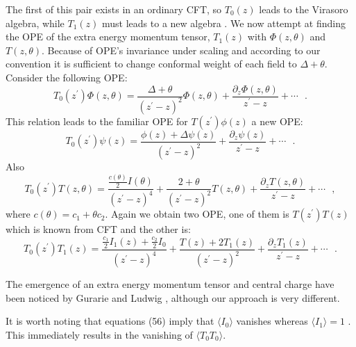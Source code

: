 \documentclass[a4paper,11pt]{article}
\begin{document}
The first of this pair exists in an ordinary CFT, so $T_{0}(z)$
leads to the Virasoro algebra, while $T_{1}(z)$ must leads to a
new algebra \cite{GL}. We now attempt at finding the OPE of the
extra energy momentum tensor, $T_{1}(z)$ with $\Phi(z,\theta)$ and
$T(z,\theta)$. Because of OPE's invariance under scaling and
according to our convention it is sufficient to change conformal
weight of each field to $\Delta+\theta$. Consider the following OPE:
\begin{equation}
T_{0}(z^{\prime})\Phi(z,\theta)=\frac{\Delta+\theta}{(z^{\prime}-z)^{2}}\Phi(z,\theta)+
\frac{\partial_{z}\Phi(z,\theta)}{z^{\prime}-z}+\cdots\:\:\:.
\end{equation}
This relation leads to the familiar OPE for $T(z^{\prime})\phi(z)$
a new OPE:
\begin{equation}
T_{0}(z^{\prime})\psi(z)=\frac{\phi(z)+\Delta\psi(z)}{(z^{\prime}-z)^{2}}+
\frac{\partial_{z}\psi(z)}{z^{\prime}-z}+\cdots\:\:\:.
\end{equation}
Also
\begin{equation}
T_{0}(z^{\prime})T(z,\theta)=\frac{\frac{c(\theta)}{2}I(\theta)}{(z^{\prime}-z)^{4}}
+\frac{2+\theta}{(z^{\prime}-z)^{2}}T(z,\theta)+\frac{\partial_{z}T(z,\theta)}{z^{\prime}-z}+\cdots\:\:\:,
\end{equation}
where $c(\theta)=c_{1}+\theta c_{2}$. Again we obtain two OPE, one
of them is $T(z^{\prime})T(z)$ which is known from CFT and the
other is:
\begin{equation}
T_{0}(z^{\prime})T_{1}(z)=\frac{\frac{c_1}{2}I_1(z)+\frac{c_2}{2}I_0}{(z^{\prime}-z)^{4}}
+\frac{T(z)+2T_{1}(z)}{(z^{\prime}-z)^{2}}+\frac{\partial_{z}T_{1}(z)}{z^{\prime}-z}+\cdots\:\:\:.
\end{equation}

The emergence of an extra energy momentum tensor and central
charge have been noticed by Gurarie and Ludwig \cite{GL},
although our approach is very different.

It is worth noting that equations (56) imply that $\langle I_0
\rangle$ vanishes whereas $\langle I_1 \rangle = 1$ . This
immediately results in the vanishing of $\langle T_{0}T_{0}
\rangle $.
\end{document}
